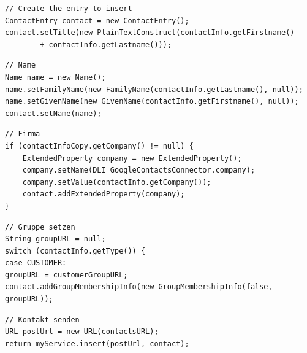 \begin{lstlisting}
// Create the entry to insert
ContactEntry contact = new ContactEntry();
contact.setTitle(new PlainTextConstruct(contactInfo.getFirstname()
		+ contactInfo.getLastname()));
\end{lstlisting}

\begin{lstlisting}
// Name
Name name = new Name();
name.setFamilyName(new FamilyName(contactInfo.getLastname(), null));
name.setGivenName(new GivenName(contactInfo.getFirstname(), null));
contact.setName(name);
\end{lstlisting}

\begin{lstlisting}	
// Firma
if (contactInfoCopy.getCompany() != null) {
	ExtendedProperty company = new ExtendedProperty();
	company.setName(DLI_GoogleContactsConnector.company);
	company.setValue(contactInfo.getCompany());
	contact.addExtendedProperty(company);
}
\end{lstlisting}

\begin{lstlisting}
// Gruppe setzen
String groupURL = null;
switch (contactInfo.getType()) {
case CUSTOMER:
groupURL = customerGroupURL;
contact.addGroupMembershipInfo(new GroupMembershipInfo(false, groupURL));
\end{lstlisting}

\begin{lstlisting}
// Kontakt senden		
URL postUrl = new URL(contactsURL);
return myService.insert(postUrl, contact);
\end{lstlisting}
